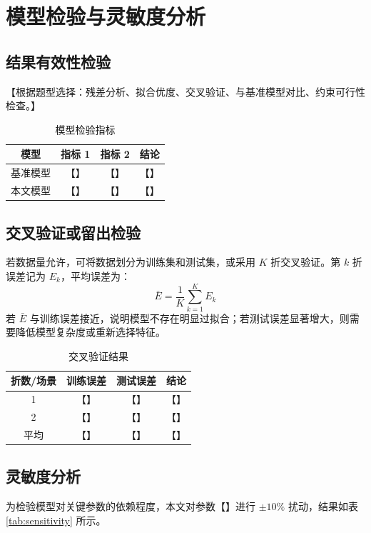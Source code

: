 \documentclass{cumcmthesis}
\begin{document}
\section{模型检验与灵敏度分析}

\subsection{结果有效性检验}
【根据题型选择：残差分析、拟合优度、交叉验证、与基准模型对比、约束可行性检查。】

\begin{table}[H]
  \centering
  \caption{模型检验指标}
  \label{tab:validation}
  \begin{tabular}{cccc}
    \toprule
    模型 & 指标 1 & 指标 2 & 结论 \\
    \midrule
    基准模型 & 【】 & 【】 & 【】 \\
    本文模型 & 【】 & 【】 & 【】 \\
    \bottomrule
  \end{tabular}
\end{table}

\subsection{交叉验证或留出检验}
若数据量允许，可将数据划分为训练集和测试集，或采用 $K$ 折交叉验证。第 $k$ 折误差记为 $E_k$，平均误差为：
\begin{equation}
  \bar{E} = \frac{1}{K}\sum_{k=1}^{K}E_k
\end{equation}
若 $\bar{E}$ 与训练误差接近，说明模型不存在明显过拟合；若测试误差显著增大，则需要降低模型复杂度或重新选择特征。

\begin{table}[H]
  \centering
  \caption{交叉验证结果}
  \label{tab:cv}
  \begin{tabular}{cccc}
    \toprule
    折数/场景 & 训练误差 & 测试误差 & 结论 \\
    \midrule
    1 & 【】 & 【】 & 【】 \\
    2 & 【】 & 【】 & 【】 \\
    平均 & 【】 & 【】 & 【】 \\
    \bottomrule
  \end{tabular}
\end{table}

\subsection{灵敏度分析}
为检验模型对关键参数的依赖程度，本文对参数【】进行 $\pm 10\%$ 扰动，结果如表 \ref{tab:sensitivity} 所示。
\end{document}
